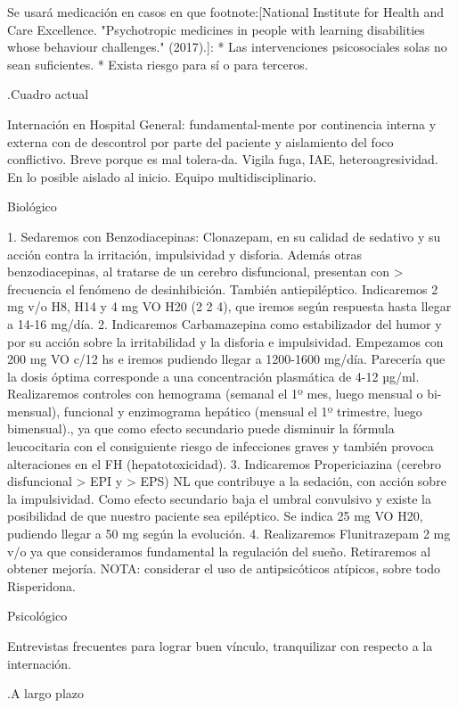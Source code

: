 \documentclass{scrbook}
\begin{document}
Se usará medicación en casos en que footnote:[National Institute for Health and Care Excellence. "Psychotropic medicines in people with learning disabilities whose behaviour challenges." (2017).]:
* Las intervenciones psicosociales solas no sean suficientes.
* Exista riesgo para sí o para terceros.

.Cuadro actual

Internación en Hospital General: fundamental-mente por continencia interna y externa con de descontrol por parte del paciente y aislamiento del foco conflictivo. Breve porque es mal tolera-da. Vigila fuga, IAE, heteroagresividad. En lo posible aislado al inicio. Equipo multidisciplinario.

Biológico

1. Sedaremos con Benzodiacepinas: Clonazepam, en su calidad de sedativo y su acción contra la irritación, impulsividad y disforia. Además otras benzodiacepinas, al tratarse de un cerebro disfuncional, presentan con > frecuencia el fenómeno de desinhibición. También antiepiléptico. Indicaremos 2 mg v/o H8, H14 y 4 mg VO H20 (2 2 4), que iremos según respuesta hasta llegar a 14-16 mg/día.
2. Indicaremos Carbamazepina como estabilizador del humor y por su acción sobre la irritabilidad y la disforia e impulsividad. Empezamos con 200 mg VO c/12 hs e iremos pudiendo llegar a 1200-1600 mg/día. Parecería que la dosis óptima corresponde a una concentración plasmática de 4-12 µg/ml. Realizaremos controles con hemograma (semanal el 1º mes, luego mensual o bi-mensual), funcional y enzimograma hepático (mensual el 1º trimestre, luego bimensual)., ya que como efecto secundario puede disminuir la fórmula leucocitaria con el consiguiente riesgo de infecciones graves y también provoca alteraciones en el FH (hepatotoxicidad).
3. Indicaremos Propericiazina (cerebro disfuncional > EPI y > EPS) NL que contribuye a la sedación, con acción sobre la impulsividad. Como efecto secundario baja el umbral convulsivo y existe la posibilidad de que nuestro paciente sea epiléptico. Se indica 25 mg VO H20, pudiendo llegar a 50 mg según la evolución.
4. Realizaremos Flunitrazepam 2 mg v/o ya que consideramos fundamental la regulación del sueño. Retiraremos al obtener mejoría. NOTA: considerar el uso de antipsicóticos atípicos, sobre todo Risperidona.

Psicológico

Entrevistas frecuentes para lograr buen vínculo, tranquilizar con respecto a la internación.

.A largo plazo
\end{document}
